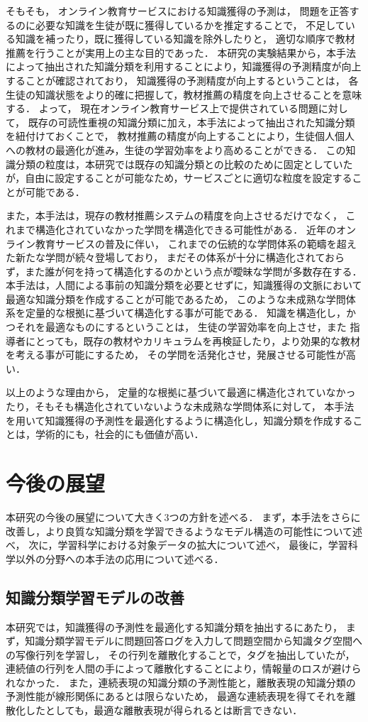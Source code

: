 そもそも，
オンライン教育サービスにおける知識獲得の予測は，
問題を正答するのに必要な知識を生徒が既に獲得しているかを推定することで，
不足している知識を補ったり，既に獲得している知識を除外したりと，
適切な順序で教材推薦を行うことが実用上の主な目的であった．
本研究の実験結果から，本手法によって抽出された知識分類を利用することにより，知識獲得の予測精度が向上することが確認されており，
知識獲得の予測精度が向上するということは，
各生徒の知識状態をより的確に把握して，教材推薦の精度を向上させることを意味する．
よって，
現在オンライン教育サービス上で提供されている問題に対して，
既存の可読性重視の知識分類に加え，本手法によって抽出された知識分類を紐付けておくことで，
教材推薦の精度が向上することにより，生徒個人個人への教材の最適化が進み，生徒の学習効率をより高めることができる．
この知識分類の粒度は，本研究では既存の知識分類との比較のために固定としていたが，自由に設定することが可能なため，サービスごとに適切な粒度を設定することが可能である．


また，本手法は，現存の教材推薦システムの精度を向上させるだけでなく，
これまで構造化されていなかった学問を構造化できる可能性がある．
近年のオンライン教育サービスの普及に伴い，
これまでの伝統的な学問体系の範疇を超えた新たな学問が続々登場しており，
まだその体系が十分に構造化されておらず，また誰が何を持って構造化するのかという点が曖昧な学問が多数存在する．
本手法は，人間による事前の知識分類を必要とせずに，知識獲得の文脈において最適な知識分類を作成することが可能であるため，
このような未成熟な学問体系を定量的な根拠に基づいて構造化する事が可能である．
知識を構造化し，かつそれを最適なものにするということは，
生徒の学習効率を向上させ，また
指導者にとっても，既存の教材やカリキュラムを再検証したり，より効果的な教材を考える事が可能にするため，
その学問を活発化させ，発展させる可能性が高い．

以上のような理由から，
定量的な根拠に基づいて最適に構造化されていなかったり，そもそも構造化されていないような未成熟な学問体系に対して，
本手法を用いて知識獲得の予測性を最適化するように構造化し，知識分類を作成することは，学術的にも，社会的にも価値が高い．


\section{今後の展望}
本研究の今後の展望について大きく3つの方針を述べる．
まず，本手法をさらに改善し，より良質な知識分類を学習できるようなモデル構造の可能性について述べ，
次に，学習科学における対象データの拡大について述べ，
最後に，学習科学以外の分野への本手法の応用について述べる．


\subsection{知識分類学習モデルの改善}
本研究では，知識獲得の予測性を最適化する知識分類を抽出するにあたり，
まず，知識分類学習モデルに問題回答ログを入力して問題空間から知識タグ空間への写像行列を学習し，
その行列を離散化することで，タグを抽出していたが，
連続値の行列を人間の手によって離散化することにより，情報量のロスが避けられなかった．
また，連続表現の知識分類の予測性能と，離散表現の知識分類の予測性能が線形関係にあるとは限らないため，
最適な連続表現を得てそれを離散化したとしても，最適な離散表現が得られるとは断言できない．

